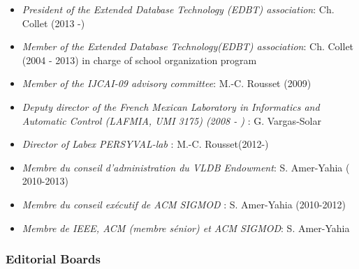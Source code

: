 \begin{itemize}
\setlength{\itemindent}{-0.5cm}
\setlength{\itemsep}{-0.1cm}

\item {\it President of the Extended Database Technology (EDBT) association}: Ch. Collet (2013 -)

\item {\it Member of the Extended Database Technology(EDBT) association}: Ch. Collet (2004 - 2013) in charge of  school organization program

\item {\it Member of the IJCAI-09 advisory committee}: M.-C. Rousset (2009)

\item {\it Deputy director of the French Mexican Laboratory in Informatics and Automatic Control (LAFMIA, UMI 3175) (2008 - ) }:  G. Vargas-Solar

\item {\it Director of Labex PERSYVAL-lab  }:  M.-C. Rousset(2012-)

\item \emph{Membre du conseil d'administration du VLDB Endowment}:  S. Amer-Yahia ( 2010-2013)

\item \emph{Membre du conseil ex\'ecutif de ACM SIGMOD }:  S. Amer-Yahia (2010-2012)

\item \emph{Membre de IEEE, ACM (membre s\'enior) et ACM SIGMOD}:  S. Amer-Yahia

\end{itemize}

\subsubsection*{Editorial Boards}

